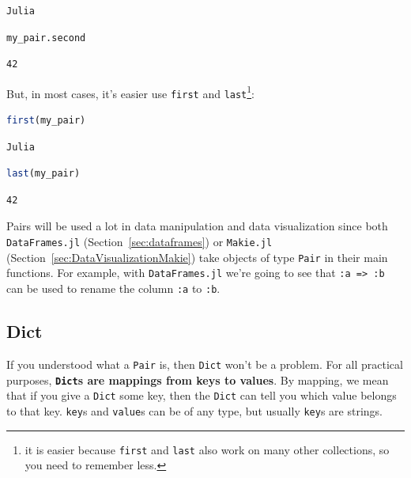 \documentclass[
  notoc %
]{tufte-book}
\newcommand{\passthrough}[1]{#1}
\begin{document}
\begin{lstlisting}[language=Output]
Julia
\end{lstlisting}

\begin{lstlisting}[language=Julia]
my_pair.second
\end{lstlisting}

\begin{lstlisting}[language=Output]
42
\end{lstlisting}

But, in most cases, it's easier use \passthrough{\lstinline!first!} and
\passthrough{\lstinline!last!}\footnote{it is easier because
  \passthrough{\lstinline!first!} and \passthrough{\lstinline!last!}
  also work on many other collections, so you need to remember less.}:

\begin{lstlisting}[language=Julia]
first(my_pair)
\end{lstlisting}

\begin{lstlisting}[language=Output]
Julia
\end{lstlisting}

\begin{lstlisting}[language=Julia]
last(my_pair)
\end{lstlisting}

\begin{lstlisting}[language=Output]
42
\end{lstlisting}

Pairs will be used a lot in data manipulation and data visualization
since both \passthrough{\lstinline!DataFrames.jl!}
(Section~\ref{sec:dataframes}) or \passthrough{\lstinline!Makie.jl!}
(Section~\ref{sec:DataVisualizationMakie}) take objects of type
\passthrough{\lstinline!Pair!} in their main functions. For example,
with \passthrough{\lstinline!DataFrames.jl!} we're going to see that
\passthrough{\lstinline!:a => :b!} can be used to rename the column
\passthrough{\lstinline!:a!} to \passthrough{\lstinline!:b!}.

\hypertarget{sec:dict}{%
\subsection{Dict}\label{sec:dict}}

If you understood what a \passthrough{\lstinline!Pair!} is, then
\passthrough{\lstinline!Dict!} won't be a problem. For all practical
purposes, \textbf{\passthrough{\lstinline!Dict!}s are mappings from keys
to values}. By mapping, we mean that if you give a
\passthrough{\lstinline!Dict!} some key, then the
\passthrough{\lstinline!Dict!} can tell you which value belongs to that
key. \passthrough{\lstinline!key!}s and \passthrough{\lstinline!value!}s
can be of any type, but usually \passthrough{\lstinline!key!}s are
strings.
\end{document}

